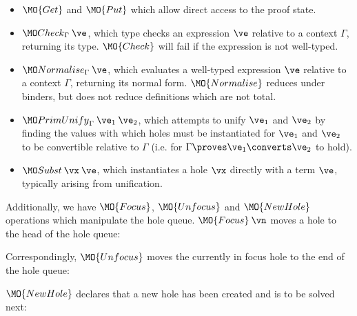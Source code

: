 \begin{itemize}
\item $\MO{Get}$ and $\MO{Put}$ which allow direct access to the proof state.
\item $\Check\:\ve$, which type checks an expression $\ve$ relative to a context
$\Gamma$, returning its type.
$\MO{Check}$ will fail
if the expression is not well-typed.
\item $\Eval\:\ve$, which evaluates a well-typed expression $\ve$ relative to a context 
$\Gamma$, returning its normal form. $\MO{Normalise}$ reduces under binders,
but does not reduce definitions which are not total.
\item 
$\PrimUnify\:\ve_1\:\ve_2$, 
which attempts to unify $\ve_1$ and $\ve_2$ by finding the values with which
holes must be instantiated for $\ve_1$ and $\ve_2$ to be convertible relative
to $\Gamma$ (i.e. for $\Gamma\proves\ve_1\converts\ve_2$ to hold).
\item $\Subst\:\vx\:\ve$, which instantiates a hole $\vx$ directly with a term
$\ve$, typically arising from unification.
\end{itemize}

\noindent
Additionally, we have $\MO{Focus}$, $\MO{Unfocus}$ and $\MO{NewHole}$
operations which manipulate
the hole queue. $\MO{Focus}\:\vn$ moves a hole to the head of the hole queue:


\noindent
Correspondingly, $\MO{Unfocus}$ moves the currently in focus hole to the
end of the hole queue:


\noindent
$\MO{NewHole}$ declares that a new hole has been created and is to be solved
next:


